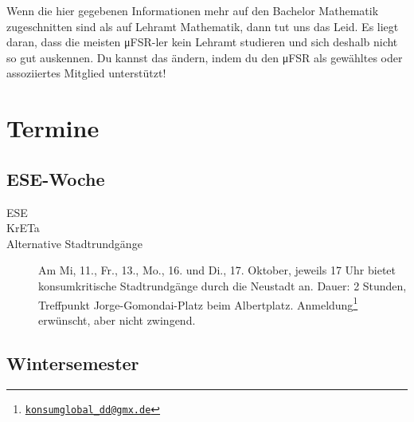 \documentclass{scrartcl}
\begin{document}
Wenn die hier gegebenen Informationen mehr auf den Bachelor
Mathematik zugeschnitten sind als auf Lehramt Mathematik,
dann tut uns das Leid. Es liegt daran, dass
die meisten μFSR-ler kein Lehramt studieren und sich deshalb
nicht so gut auskennen. Du kannst das ändern, indem du den
μFSR als gewähltes oder assoziiertes Mitglied unterstützt!

\section*{Termine}
\subsection*{ESE-Woche}
\begin{description}
  \item[ESE]  %
  \item[KrETa]  %
  \item[Alternative Stadtrundgänge] Am Mi, 11., Fr., 13., Mo., 16. und Di., 17. Oktober, jeweils 17 Uhr
    bietet  konsumkritische Stadtrundgänge durch die Neustadt an. Dauer: 2 Stunden,
    Treffpunkt Jorge-Gomondai-Platz beim Albertplatz. Anmeldung\footnote{\href{mailto:konsumglobal_dd@gmx.de}{\nolinkurl{konsumglobal_dd@gmx.de}}} erwünscht, aber nicht zwingend.
\end{description}

\subsection*{Wintersemester}
\end{document}
